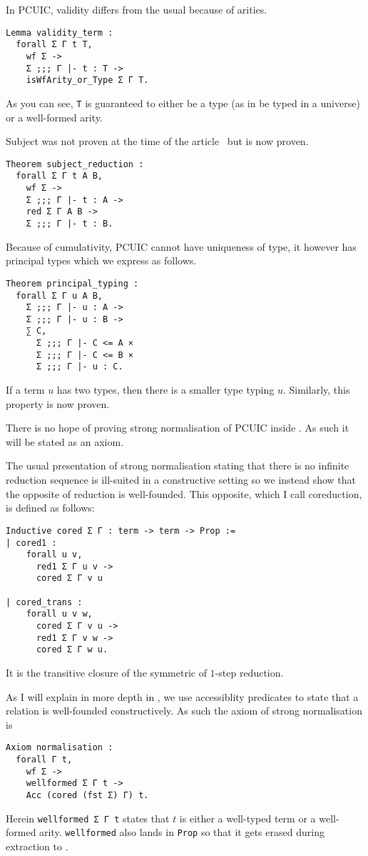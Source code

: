 
In \acrshort{PCUIC}, validity differs from the usual because of arities.
\begin{verbatim}
Lemma validity_term :
  forall Σ Γ t T,
    wf Σ ->
    Σ ;;; Γ |- t : T ->
    isWfArity_or_Type Σ Γ T.
\end{verbatim}
As you can see, \texttt{T} is guaranteed to either be a type (as in
be typed in a universe) or a well-formed arity.


Subject was not proven at the time of the article~ but
is now proven.
\begin{verbatim}
Theorem subject_reduction :
  forall Σ Γ t A B,
    wf Σ ->
    Σ ;;; Γ |- t : A ->
    red Σ Γ A B ->
    Σ ;;; Γ |- t : B.
\end{verbatim}


Because of cumulativity, \acrshort{PCUIC} cannot have uniqueness of type, it
however has principal types which we express as follows.
\begin{verbatim}
Theorem principal_typing :
  forall Σ Γ u A B,
    Σ ;;; Γ |- u : A ->
    Σ ;;; Γ |- u : B ->
    ∑ C,
      Σ ;;; Γ |- C <= A ×
      Σ ;;; Γ |- C <= B ×
      Σ ;;; Γ |- u : C.
\end{verbatim}
If a term \(u\) has two types, then there is a smaller type typing \(u\).
Similarly, this property is now proven.


There is no hope of proving strong normalisation of \acrshort{PCUIC} inside
\Coq. As such it will be stated as an axiom.

The usual presentation of strong normalisation stating that there is no infinite
reduction sequence is ill-suited in a constructive setting so we instead show
that the opposite of reduction is well-founded.
This opposite, which I call coreduction, is defined as follows:
\begin{verbatim}
Inductive cored Σ Γ : term -> term -> Prop :=
| cored1 :
    forall u v,
      red1 Σ Γ u v ->
      cored Σ Γ v u

| cored_trans :
    forall u v w,
      cored Σ Γ v u ->
      red1 Σ Γ v w ->
      cored Σ Γ w u.
\end{verbatim}
It is the transitive closure of the symmetric of \(1\)-step reduction.

As I will explain in more depth in , we use accessiblity
predicates to state that a relation is well-founded constructively.
As such the axiom of strong normalisation is
\begin{verbatim}
Axiom normalisation :
  forall Γ t,
    wf Σ ->
    wellformed Σ Γ t ->
    Acc (cored (fst Σ) Γ) t.
\end{verbatim}
Herein \texttt{wellformed Σ Γ t} states that \(t\) is either a
well-typed term or a well-formed arity. \texttt{wellformed} also lands
in \texttt{Prop} so that it gets erased during extraction to \ocaml.